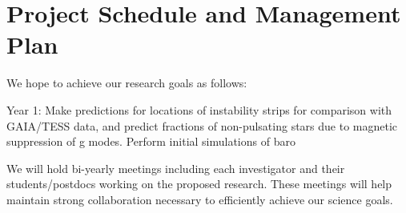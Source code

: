 \section{Project Schedule and Management Plan}

We hope to achieve our research goals as follows:

Year 1: Make predictions for locations of instability strips for comparison with GAIA/TESS data, and predict fractions of non-pulsating stars due to magnetic suppression of g modes. Perform initial simulations of baro 

We will  hold bi-yearly meetings including each investigator and their students/postdocs working on the proposed research. These meetings will help maintain strong collaboration necessary to efficiently achieve our science goals.
